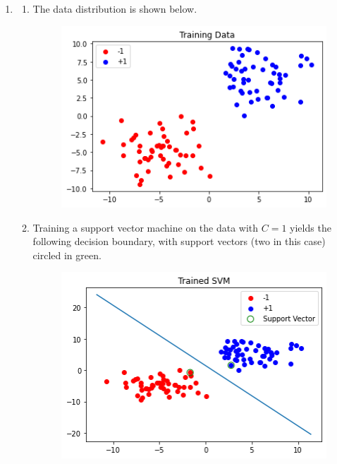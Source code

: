 \documentclass{article}
\begin{document}
	\begin{enumerate}
		\item
		\begin{enumerate}
			\item
			The data distribution is shown below.
			\begin{figure}[H]
				\centering
				\includegraphics[scale=0.5]{img/dataset.png}
			\end{figure}

			\item
				Training a support vector machine on the data with $C=1$ yields the following decision boundary, with support vectors (two in this case) circled in green.
			\begin{figure}[H]
                                \centering
                                \includegraphics[scale=0.5]{img/single-svm.png}
                        \end{figure}


\end{enumerate}
\end{enumerate}
\end{document}

